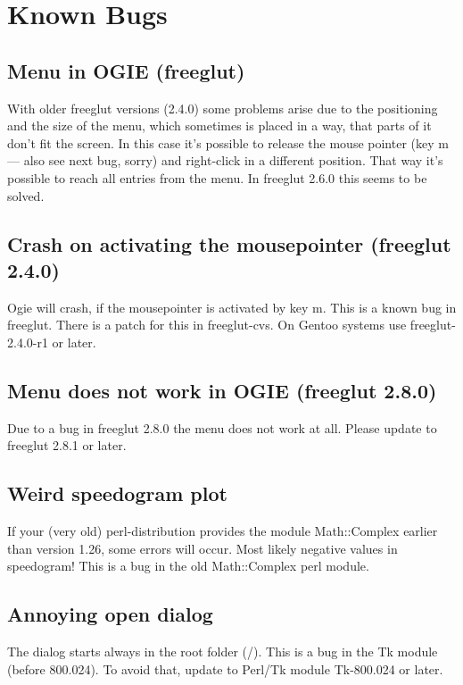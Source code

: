 \section{Known Bugs}
\label{bugs}

\subsection*{Menu in OGIE (freeglut)}
With older freeglut versions (2.4.0) some problems arise due to the positioning and the size of the
menu, which sometimes is placed in a way, that parts of it don't fit the screen.
In this case it's possible to release the mouse pointer (key m --- also see next bug, sorry) and right-click in a different position. That way it's possible to reach all entries from the menu.
In freeglut 2.6.0 this seems to be solved.

\subsection*{Crash on activating the mousepointer (freeglut 2.4.0)}
Ogie will crash, if the mousepointer is activated by key m. This is a known bug in freeglut.
There is a patch for this in freeglut-cvs. On Gentoo systems use freeglut-2.4.0-r1 or later.

\subsection*{Menu does not work in OGIE (freeglut 2.8.0)}
Due to a bug in freeglut 2.8.0 the menu does not work at all.
Please update to freeglut 2.8.1 or later.

\subsection*{Weird speedogram plot}
If your (very old) perl-distribution provides the module Math::Complex earlier
than version 1.26, some errors will occur. Most likely negative values in
speedogram! This is a bug in the old Math::Complex perl module.

\subsection*{Annoying open dialog}
The  dialog starts always in the root folder (/). This is  a bug in the
Tk module (before 800.024). To avoid that, update to Perl/Tk module Tk-800.024 or later.

